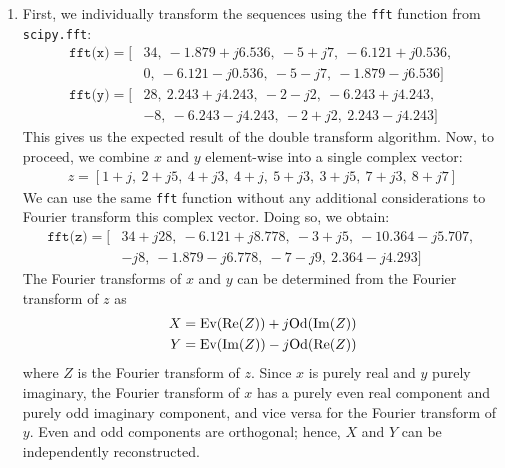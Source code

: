 \documentclass[a4paper, 11pt]{article}
\begin{document}
\begin{enumerate}[label=\alph*)]

    \item First, we individually transform the sequences using the \texttt{fft}
    function from \texttt{scipy.fft}:
    \begin{align*}
        \texttt{fft(x)} = [&34,\ -1.879+j6.536,\ -5+j7,\ -6.121+j0.536,\ \\
                           &0,\ -6.121-j0.536,\ -5-j7,\ -1.879-j6.536] \\
        \texttt{fft(y)} = [&28,\ 2.243+j4.243,\ -2-j2,\ -6.243+j4.243,\ \\
                           &-8,\ -6.243-j4.243,\ -2+j2,\ 2.243-j4.243]
    \end{align*}
    This gives us the expected result of the double transform algorithm. Now, to
    proceed, we combine $x$ and $y$ element-wise into a single complex vector:
    \begin{align*}
        z = [1+j,\ 2+j5,\ 4+j3,\ 4+j,\ 5+j3,\ 3+j5,\ 7+j3,\ 8+j7]
    \end{align*}
    We can use the same \texttt{fft} function without any additional
    considerations to Fourier transform this complex vector. Doing so, we
    obtain:
    \begin{align*}
        \texttt{fft(z)} = [&34+j28,\ -6.121+j8.778,\ -3+j5,\ -10.364-j5.707,\ \\
                           &-j8,\ -1.879-j6.778,\ -7-j9,\ 2.364-j4.293]
    \end{align*}
    The Fourier transforms of $x$ and $y$ can be determined from the
    Fourier transform of $z$ as
    \begin{align*}
        X &= \text{Ev}(\Re(Z)) + j\text{Od}(\Im(Z)) \\
        Y &= \text{Ev}(\Im(Z)) - j\text{Od}(\Re(Z))
    \end{align*}
    where $Z$ is the Fourier transform of $z$. Since $x$ is purely real and $y$
    purely imaginary, the Fourier transform of $x$ has a purely even real
    component and purely odd imaginary component, and vice versa for the Fourier
    transform of $y$. Even and odd components are orthogonal; hence, $X$ and $Y$
    can be independently reconstructed.


\end{enumerate}
\end{document}
